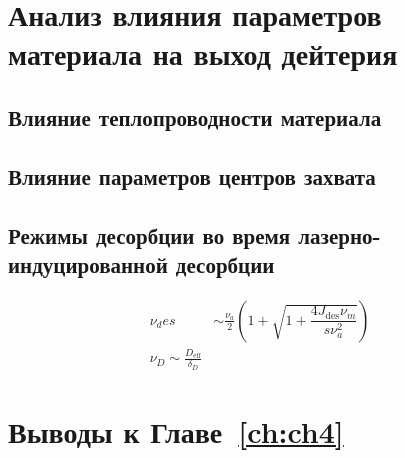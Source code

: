 \section{Анализ влияния параметров материала на выход дейтерия}\label{sec:ch4/seс3}
\subsection{Влияние теплопроводности материала}\label{subsec:ch4/seс3/subsec1}
\subsection{Влияние параметров центров захвата}\label{subsec:ch4/seс3/subsec2}
\subsection{Режимы десорбции во время лазерно-индуцированной десорбции}\label{sec:ch4/seс3/subsec3}

\begin{subequations}
    \begin{align}
        \nu_des & \sim \frac{\nu_a}{2} \left( 1 + \sqrt{1+\dfrac{4J_\mathrm{des}\nu_m}{s\nu_a^2}} \right) \\
        \nu_D \sim \frac{D_\mathrm{eff}}{\delta_D}
    \end{align}

\end{subequations}

\section{Выводы к Главе~\ref{ch:ch4}}

\clearpage
